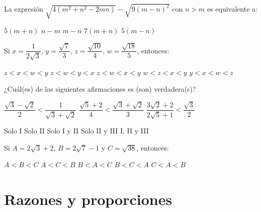 \documentclass[pagina vacia]{srs}
\begin{document}
\begin{preguntas}
\pregunta La expresión \(\sqrt{4(m^2+n^2-2mn)} - \sqrt{9(m-n)^2}\) con \(n>m\) es equivalente a:
\begin{vertical}
\alternativa \(5(m+n)\)
\alternativa \(n-m\)
\alternativa \(m-n\)
\alternativa \(7(m+n)\)
\alternativa \(5(m-n)\)
\end{vertical}

\pregunta Si \(x = \dfrac{1}{2\sqrt{3}}\), \(y = \dfrac{\sqrt{7}}{3}\), \(z = \dfrac{\sqrt{10}}{4}\), \(w = \dfrac{\sqrt{18}}{5}\), entonces:
\begin{vertical}
\alternativa \(z<x<w<y\)
\alternativa \(z<w<y<x\)
\alternativa \(z<w<x<y\)
\alternativa \(w<z<x<y\)
\alternativa \(y<x<w<z\)
\end{vertical}

\pregunta ¿Cuál(es) de las siguientes afirmaciones es (son) verdadera(s)?
\begin{verticali}
\alternativa \(\dfrac{\sqrt{3}-\sqrt{2}}{2} < \dfrac{1}{\sqrt{3}+\sqrt{2}}\)
\alternativa \(\dfrac{\sqrt{5}+2}{4} < \dfrac{\sqrt{3}+\sqrt{2}}{3}\)
\alternativa \(\dfrac{3\sqrt{2}+2}{2\sqrt{5}+1} < \dfrac{\sqrt{3}}{2}\)
\end{verticali}
\begin{vertical}
\alternativa Solo I
\alternativa Solo II
\alternativa Solo I y II
\alternativa Solo II y III
\alternativa I, II y III
\end{vertical}

\pregunta Si \(A=2\sqrt{3}+2\), \(B=2\sqrt{7}-1\) y \(C=\sqrt{38}\), entonces:
\begin{vertical}
\alternativa \(A<B<C\)
\alternativa \(A<C<B\)
\alternativa \(B<A<C\)
\alternativa \(B<C<A\)
\alternativa \(C<A<B\)
\end{vertical}

\end{preguntas}

\section{Razones y proporciones}
\end{document}
